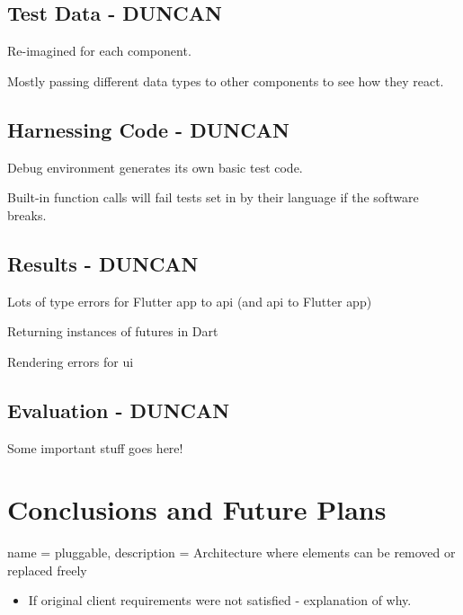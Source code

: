 \documentclass{article}
\begin{document}
    \subsection{Test Data - DUNCAN}
    
    
    Re-imagined for each component.\par
    
    Mostly passing different data types to other components to see how they react.\par
    
    \subsection{Harnessing Code - DUNCAN}
    Debug environment generates its own basic test code.\par
    Built-in function calls will fail tests set in by their language if the software breaks.\par
    
    \subsection{Results - DUNCAN}
    Lots of type errors for Flutter \gls{app} to \acrshort{api} (and \acrshort{api} to Flutter \gls{app})\par
    Returning instances of futures in Dart\par
    Rendering errors for \acrshort{ui}\par
    
    \subsection{Evaluation - DUNCAN}
    \label{subsec:evaluation}
    Some important stuff goes here!\par


\newpage
\section{Conclusions and Future Plans}
\label{sec:conlusion}
        {
        name = pluggable,
        description = {Architecture where elements can be removed or replaced freely}
        }
    \begin{itemize}
        \item If original client requirements were not satisfied - explanation of why.
    \end{itemize}
    
\end{document}
